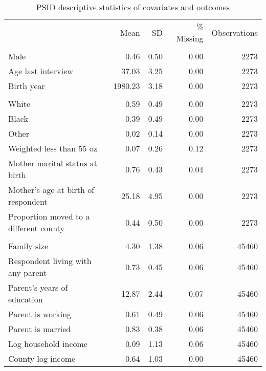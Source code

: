 \begin{table}[htp]
\setlength{\tabcolsep}{3pt}
\renewcommand{\arraystretch}{0.75}
\centering
\begin{threeparttable}
\centering
\caption{PSID descriptive statistics of covariates and outcomes} 
\label{tab:psid_descriptives}
\begingroup\fontsize{9pt}{10pt}\selectfont
\begin{tabular}{lrrrr}
  \hline
\addlinespace
  & Mean & SD & \% Missing & Observations \\
\addlinespace
 \hline
  \addlinespace
\multicolumn{5}{l}{\textbf{\textit{Time-invariant covariates}}} \\
\addlinespace
Male & 0.46 & 0.50 & 0.00 & 2273 \\ 
  Age last interview & 37.03 & 3.25 & 0.00 & 2273 \\ 
  Birth year & 1980.23 & 3.18 & 0.00 & 2273 \\ 
   \addlinespace
\multicolumn{5}{l}{\textit{Race-Ethnicity}} \\
\quad White & 0.59 & 0.49 & 0.00 & 2273 \\ 
  \quad Black & 0.39 & 0.49 & 0.00 & 2273 \\ 
  \quad Other & 0.02 & 0.14 & 0.00 & 2273 \\ 
   \addlinespace
Weighted less than 55 oz & 0.07 & 0.26 & 0.12 & 2273 \\ 
  Mother marital status at birth & 0.76 & 0.43 & 0.04 & 2273 \\ 
  Mother's age at birth of respondent & 25.18 & 4.95 & 0.00 & 2273 \\ 
  Proportion moved to a different county & 0.44 & 0.50 & 0.00 & 2273 \\ 
   \addlinespace
\multicolumn{5}{l}{\textbf{\textit{Time-variant covariates}}} \\
\addlinespace
Family size & 4.30 & 1.38 & 0.06 & 45460 \\ 
  Respondent living with any parent & 0.73 & 0.45 & 0.06 & 45460 \\ 
  Parent's years of education & 12.87 & 2.44 & 0.07 & 45460 \\ 
  Parent is working & 0.61 & 0.49 & 0.06 & 45460 \\ 
  Parent is married & 0.83 & 0.38 & 0.06 & 45460 \\ 
  Log household income & 0.09 & 1.13 & 0.06 & 45460 \\ 
  County log income & 0.64 & 1.03 & 0.00 & 45460 \\ 

\end{tabular}
\end{threeparttable}
\end{table}
